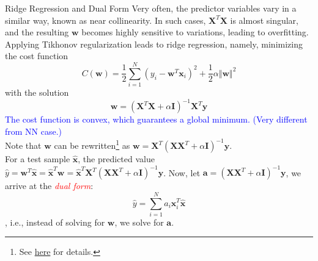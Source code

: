 \documentclass[aspectratio=169]{beamer}
\begin{document}
\begin{frame}{Ridge Regression and Dual Form}
\tiny
Very often, the predictor variables vary in a similar way, known as near collinearity. In such cases, $\mathbf{X}^T\mathbf{X}$ is almost singular, and the resulting $\mathbf{w}$ becomes highly sensitive to variations, leading to overfitting.\\
Applying Tikhonov regularization leads to ridge regression, namely, minimizing the cost function
\begin{equation}
  C(\mathbf{w})=\frac{1}{2}\sum_{i=1}^{N}(y_i-\mathbf{w}^T\mathbf{x}_i)^2+\frac{1}{2}\alpha\Vert\mathbf{w}\Vert^2
\end{equation}
with the solution
\begin{equation}
  \mathbf{w}=(\mathbf{X}^T\mathbf{X}+\alpha\mathbf{I})^{-1}\mathbf{X}^T\mathbf{y}
\end{equation}
\textcolor{blue}{The cost function is convex, which guarantees a global minimum. (Very different from NN case.)}\\
Note that $\mathbf{w}$ can be rewritten\footnote{See \href{http://stat.wikia.com/wiki/Kernel_Ridge_Regression}{here} for details.} as $\mathbf{w}=\mathbf{X}^T(\mathbf{X}\mathbf{X}^T+\alpha\mathbf{I})^{-1}\mathbf{y}$.\\
For a test sample $\hat{\mathbf{x}}$, the predicted value $\hat{y}=\mathbf{w}^T\hat{\mathbf{x}}=\hat{\mathbf{x}}^T\mathbf{w}=\hat{\mathbf{x}}^T\mathbf{X}^T(\mathbf{X}\mathbf{X}^T+\alpha\mathbf{I})^{-1}\mathbf{y}$. Now, let $\mathbf{a}=(\mathbf{X}\mathbf{X}^T+\alpha\mathbf{I})^{-1}\mathbf{y}$, we arrive at the \textcolor{red}{\emph{dual form}}:
\begin{equation}
  \hat{y}=\sum_{i=1}^{N}a_i\mathbf{x}_i^T\hat{\mathbf{x}}
\end{equation}
, i.e., instead of solving for $\mathbf{w}$, we solve for $\mathbf{a}$.
\end{frame}
\end{document}
